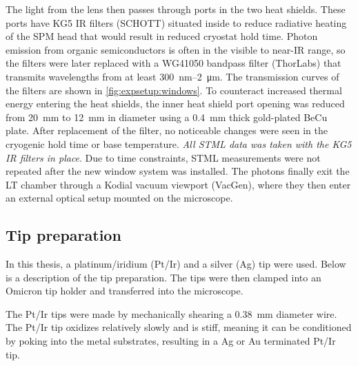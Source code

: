 The light from the lens then passes through ports in the two heat shields. These ports have KG5 \ac{IR} filters (SCHOTT) situated inside to reduce radiative heating of the \ac{SPM} head that would result in reduced cryostat hold time. Photon emission from organic semiconductors is often in the visible to near-\ac{IR} range, so the filters were later replaced with a WG41050 bandpass filter  (ThorLabs) that transmits wavelengths from at least \SI{300}{nm}--\SI{2}{\micro m}. The transmission curves of the filters are shown in \autoref{fig:expsetup:windows}. To counteract increased thermal energy entering the heat shields, the inner heat shield port opening was reduced from \SI{20}{mm} to \SI{12}{mm} in diameter using a \SI{0.4}{mm} thick gold-plated BeCu plate. After replacement of the filter, no noticeable changes were seen in the cryogenic hold time or base temperature. \emph{All \ac{STML} data was taken with the KG5 \ac{IR} filters in place}. Due to time constraints, \ac{STML} measurements were not repeated after the new window system was installed. The photons finally exit the \ac{LT} chamber through a Kodial vacuum viewport (VacGen), where they then enter an external optical setup mounted on the microscope. 



\subsection{Tip preparation}
\label{sec:expsetup:tip_prep}

In this thesis, a platinum/iridium (Pt/Ir) and a silver (Ag) tip were used. Below is a description of the tip preparation. The tips were then clamped into an Omicron tip holder and transferred into the microscope. 

The Pt/Ir tips were made by mechanically shearing a \SI{0.38}{mm} diameter wire. The Pt/Ir tip oxidizes relatively slowly and is stiff, meaning it can be conditioned by poking into the metal substrates, resulting in a Ag or Au terminated Pt/Ir tip. 

